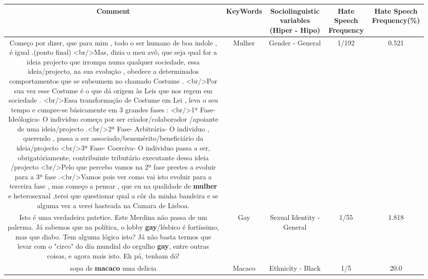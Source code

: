 \documentclass[11pt]{article}
\newlength\mylength
\begin{document}
\begin{center}
\setlength\mylength{\dimexpr\textwidth - 1\arrayrulewidth - 50\tabcolsep}
\begin{longtable}{|C{.65\mylength}|C{.30\mylength}|C{.12\mylength}|C{.12\mylength}|C{.12\mylength}|}
\hline
\textbf{Comment} & \textbf{KeyWords} & \textbf{Sociolinguistic variables (Hiper - Hipo)}  & \textbf{Hate Speech Frequency} & \textbf{Hate Speech Frequency(\%)} \\
\hline{}\small Começo por dizer,  que para mim , todo o ser humano de boa indole ,  é igual .(ponto final)  <br/>Mas, dizia o meu avô,  que seja qual for a ideia projecto  que irrompa numa qualquer sociedade, essa ideia/projecto,  na sua evolução ,  obedece a determinados comportamentos que se subsumem no chamado Costume . <br/>Por sua vez esse Costume é o que dá origem às Leis que nos regem em sociedade . <br/>Essa transformação de Costume em Lei , leva o seu tempo e cumpre-se básicamente em  3 grandes fases : <br/>1ª Fase- Ideólogica- O individuo começa por ser criador/colaborador /apoiante de uma ideia/projecto .<br/>2ª Fase- Arbitrária- O individuo , querendo , passa a ser associado/benemérito/beneficiário da ideia/projecto <br/>3ª Fase- Coerciva- O individuo passa a ser,  obrigatóriamente,  contribuinte  tributário executante  dessa ideia /projecto <br/>Pelo  que percebo vamos na 2ª fase prestes a evoluir para a 3ª fase .<br/>Vamos pois ver como vai isto evoluir para a terceira fase , mas começo a pensar , que eu na qualidade de \textbf{mulher} e heterosexual ,terei que questionar qual a côr da minha bandeira e se alguma vez a verei hasteada na Camara de Lisboa.\normalsize   & Mulher & Gender - General & 1/192 & 0.521 \\  \hline
  \small Isto é uma verdadeira patetice. Este Merdina não passa de um palerma. Já sabemos que na política, o lobby \textbf{gay}/lésbico é fortíssimo, mas que diabo. Tem alguma lógica isto? Já não basta termos que levar com o "circo" do dia mundial do orgulho \textbf{gay}, entre outras coisas, e agora mais isto. Eh pá, tenham dó!\normalsize   & Gay & Sexual Identity - General & 1/55 & 1.818 \\  \hline
  \small sopa de \textbf{macaco} uma delicia\normalsize   & Macaco & Ethnicity - Black & 1/5 & 20.0 \\  \hline
  
\end{longtable}
\end{center}
\end{document}
